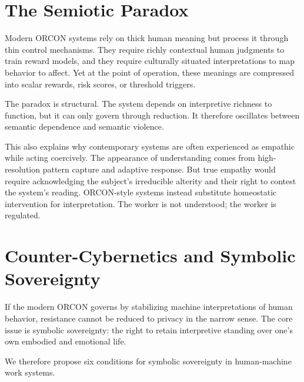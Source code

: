 \documentclass[runningheads]{llncs}
\begin{document}
\section{The Semiotic Paradox}

Modern ORCON systems rely on thick human meaning but process it through thin control mechanisms. They require richly contextual human judgments to train reward models, and they require culturally situated interpretations to map behavior to affect. Yet at the point of operation, these meanings are compressed into scalar rewards, risk scores, or threshold triggers.

The paradox is structural. The system depends on interpretive richness to function, but it can only govern through reduction. It therefore oscillates between semantic dependence and semantic violence.

This also explains why contemporary systems are often experienced as empathic while acting coercively. The appearance of understanding comes from high-resolution pattern capture and adaptive response. But true empathy would require acknowledging the subject's irreducible alterity and their right to contest the system's reading. ORCON-style systems instead substitute homeostatic intervention for interpretation. The worker is not understood; the worker is regulated.

\section{Counter-Cybernetics and Symbolic Sovereignty}

If the modern ORCON governs by stabilizing machine interpretations of human behavior, resistance cannot be reduced to privacy in the narrow sense. The core issue is symbolic sovereignty: the right to retain interpretive standing over one's own embodied and emotional life.

We therefore propose six conditions for symbolic sovereignty in human-machine work systems.
\end{document}
